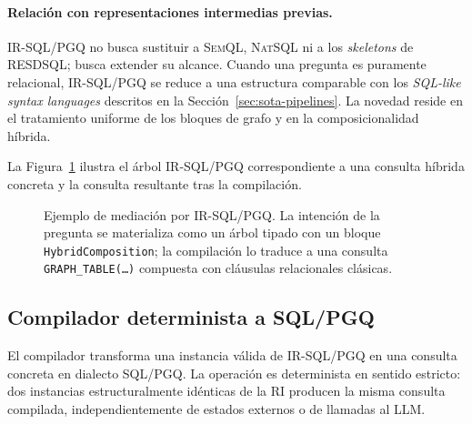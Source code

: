 \paragraph{Relación con representaciones intermedias previas.} IR-SQL/PGQ no busca sustituir a \textsc{SemQL}, \textsc{NatSQL} ni a los \emph{skeletons} de \textsc{RESDSQL}; busca extender su alcance. Cuando una pregunta es puramente relacional, IR-SQL/PGQ se reduce a una estructura comparable con los \emph{SQL-like syntax languages} descritos en la Sección~\ref{sec:sota-pipelines}. La novedad reside en el tratamiento uniforme de los bloques de grafo y en la composicionalidad híbrida.

La Figura~\ref{fig:prop-ir-ejemplo} ilustra el árbol IR-SQL/PGQ correspondiente a una consulta híbrida concreta y la consulta resultante tras la compilación.

\begin{figure}[htb]
    \centering
    \caption{Ejemplo de mediación por IR-SQL/PGQ. La intención de la pregunta se materializa como un árbol tipado con un bloque \texttt{HybridComposition}; la compilación lo traduce a una consulta \texttt{GRAPH\_TABLE(\ldots)} compuesta con cláusulas relacionales clásicas.}
    \label{fig:prop-ir-ejemplo}
\end{figure}

\subsection{Compilador determinista a SQL/PGQ}
\label{subsec:prop-compilador}

El compilador transforma una instancia válida de IR-SQL/PGQ en una consulta concreta en dialecto \ac{SQL}/\ac{PGQ}. La operación es determinista en sentido estricto: dos instancias estructuralmente idénticas de la \ac{RI} producen la misma consulta compilada, independientemente de estados externos o de llamadas al \ac{LLM}.

